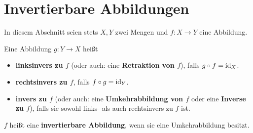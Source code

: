 \section{Invertierbare Abbildungen}


In diesem Abschnitt seien stets $X,Y$ zwei Mengen und $f:X\to Y$ eine Abbildung.


\begin{de}[Umkehrabbildung] \label{def:umkehrabb}    
    Eine Abbildung $g:Y \to X$ heißt 
    \begin{itemize}
        \item \textbf{linksinvers zu $f$} (oder auch: eine \textbf{Retraktion von $f$}), falls $g\circ f=\mathrm{id}_X$.
        \item \textbf{rechtsinvers zu $f$}, falls $f\circ g=\mathrm{id}_Y$.
        \item \textbf{invers zu $f$} (oder auch: eine \textbf{Umkehrabbildung von $f$} oder eine \textbf{Inverse zu $f$}), falls sie sowohl links- als auch rechtsinvers zu $f$ ist.
    \end{itemize}
    $f$ heißt eine \textbf{invertierbare Abbildung}, wenn sie eine Umkehrabbildung besitzt.
\end{de}


